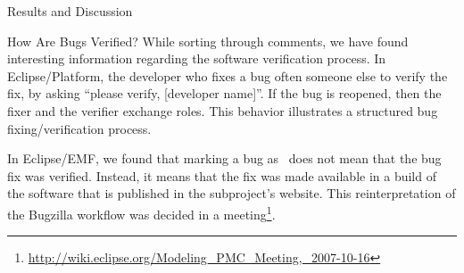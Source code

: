 \begin{section}{Results and Discussion}
\begin{subsection}{How Are Bugs Verified?}
	While sorting through comments, we have found interesting information regarding the software verification process. In Eclipse/Platform, the developer who fixes a bug often someone else to verify the fix, by asking ``please verify, [developer name]''. If the bug is reopened, then the fixer and the verifier exchange roles. This behavior illustrates a structured bug fixing/verification process.
	
	In Eclipse/EMF, we found that marking a bug as \VERIFIED\ does not mean that the bug fix was verified. Instead, it means that the fix was made available in a build of the software that is published in the subproject's website. This reinterpretation of the Bugzilla workflow was decided in a meeting\footnote{\url{http://wiki.eclipse.org/Modeling_PMC_Meeting,_2007-10-16}}.


	





\end{subsection}
\end{section}
